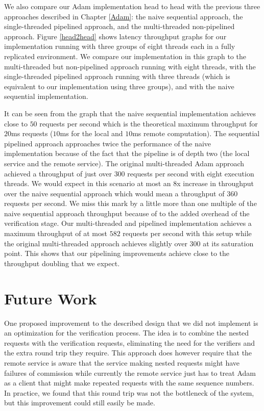 \documentclass[11pt, oneside]{report}
\begin{document}
We also compare our Adam implementation head to head with the previous three approaches described in Chapter \ref{Adam}: the naive sequential approach, the single-threaded pipelined approach, and the multi-threaded non-pipelined approach. 
Figure \ref{head2head} shows latency throughput graphs for our implementation running with three groups of eight threads each in a fully replicated environment. 
We compare our implementation in this graph to the multi-threaded but non-pipelined approach running with eight threads, with the single-threaded pipelined approach running with three threads (which is equivalent to our implementation using three groups), and with the naive sequential implementation. 

It can be seen from the graph that the naive sequential implementation achieves close to $50$ requests per second which is the theoretical maximum throughput for $20$ms requests ($10$ms for the local and $10$ms remote computation). 
The sequential pipelined approach approaches twice the performance of the naive implementation because of the fact that the pipeline is of depth two (the local service and the remote service).
The original multi-threaded Adam approach achieved a throughput of just over $300$ requests per second with eight execution threads. We would expect in this scenario at most an 8x increase in throughput over the naive sequential approach which would mean a throughput of $360$ requests per second.
We miss this mark by a little more than one multiple of the naive sequential approach throughput because of to the added overhead of the verification stage.
Our multi-threaded and pipelined implementation achieves a maximum throughput of at most $582$ requests per second with this setup while the original multi-threaded approach achieves slightly over $300$ at its saturation point. 
This shows that our pipelining improvements achieve close to the throughput doubling that we expect.

\chapter{Future Work}\label{FutureWork}

One proposed improvement to the described design that we did not implement is an optimization for the verification process.
The idea is to combine the nested requests with the verification requests, eliminating the need for the verifiers and the extra round trip they require.
This approach does however require that the remote service is aware that the service making nested requests might have failures of commission while currently the remote service just has to treat Adam as a client that might make repeated requests with the same sequence numbers. 
In practice, we found that this round trip was not the bottleneck of the system, but this improvement could still easily be made.
\end{document}
